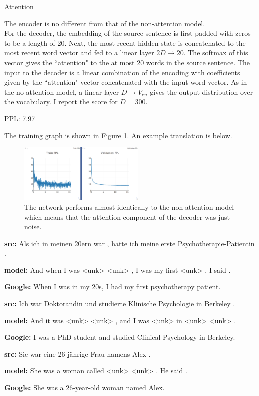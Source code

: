 \documentclass[11pt]{article}
\begin{document}
\begin{subsection}{Attention}

The encoder is no different from that of the non-attention model.\\
For the decoder, the embedding of the source sentence is first padded with zeros to be a length of 20. Next, the most recent hidden state is concatenated to the most recent word vector and fed to a linear layer $2D \rightarrow 20$. The softmax of this vector gives the ``attention" to the at most 20 words in the source sentence. The input to the decoder is a linear combination of the encoding with coefficients given by the ``attention" vector concatenated with the input word vector. As in the no-attention model, a linear layer $D \rightarrow V_{en}$ gives the output distribution over the vocabulary. I report the score for $D=300$.\\
\centerline{PPL: 7.97}
The training graph is shown in Figure \ref{fig:att}. An example translation is below.

 \begin{figure}
  \centering
  \includegraphics[width=6cm]{imgs/att}
  \caption{\label{fig:att} The network performs almost identically to the non attention model which means that the attention component of the decoder was just noise.}
\end{figure}

\centerline{{\bf src:} Als ich in meinen 20ern war , hatte ich meine erste Psychotherapie-Patientin .}
\centerline{{\bf model:} And when I was <unk> <unk> , I was my first <unk> . I said .}
\centerline{{\bf Google:} When I was in my 20s, I had my first psychotherapy patient.}
\centerline{}
\centerline{{\bf src:} Ich war Doktorandin und studierte Klinische Psychologie in Berkeley .}
\centerline{{\bf model:} And it was <unk> <unk> , and I was <unk> in <unk> <unk> .}
\centerline{{\bf Google:} I was a PhD student and studied Clinical Psychology in Berkeley.}
\centerline{}
\centerline{{\bf src:} Sie war eine 26-jährige Frau namens Alex .}
\centerline{{\bf model:} She was a woman called <unk> <unk> . He said .}
\centerline{{\bf Google:} She was a 26-year-old woman named Alex.}


\end{subsection}
\end{document}

